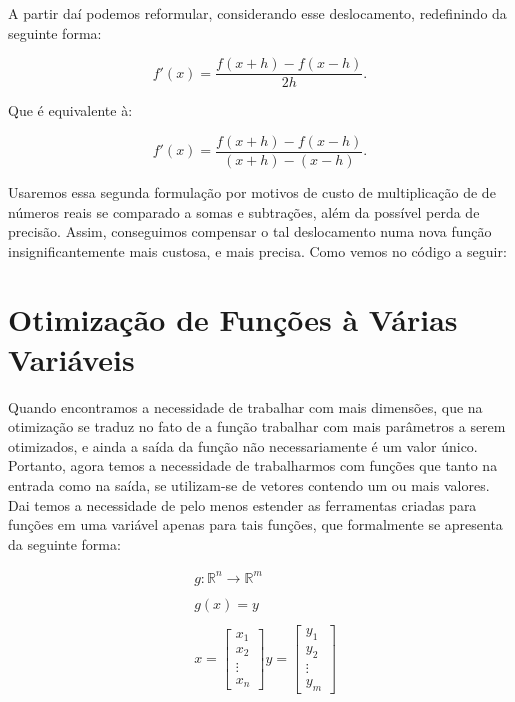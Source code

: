 A partir daí podemos reformular, considerando esse deslocamento, redefinindo
da seguinte forma:


\begin{equation}
    f'(x) = \frac{f(x + h) - f(x - h)}{2h}.
\end{equation}

Que é equivalente à:

\begin{equation}
    f'(x) = \frac{f(x + h) - f(x - h)}{(x + h) - (x - h)}.
\end{equation}


Usaremos essa segunda formulação por motivos de custo de multiplicação de de
números reais se comparado a somas e subtrações, além da possível perda de
precisão. Assim, conseguimos compensar o tal deslocamento numa nova função
insignificantemente mais custosa, e mais precisa. Como vemos no código a seguir:




\section{{Otimização de Funções à Várias Variáveis}}

\hspace{0.8cm}
Quando encontramos a necessidade de trabalhar com mais dimensões, que na
otimização se traduz no fato de a função trabalhar com mais parâmetros a serem
otimizados, e ainda a saída da função não necessariamente é um valor único.
Portanto, agora temos a necessidade de trabalharmos com funções que tanto na
entrada como na saída, se utilizam-se de vetores contendo um ou mais valores.
Dai temos a necessidade de pelo menos estender as ferramentas criadas para
funções em uma variável apenas para tais funções, que formalmente se apresenta
da seguinte forma:


\begin{equation}
    \begin{array}{ccc}
        &   g: \mathbb{R}^n \rightarrow \mathbb{R}^m\\
        &\\
        &   g(x) = y\\
        &\\
        &
        x = \begin{bmatrix} x_1\\ x_2\\ \vdots\\ x_n \end{bmatrix}
        y = \begin{bmatrix} y_1\\ y_2\\ \vdots\\ y_m \end{bmatrix}

    \end{array}
\end{equation}


